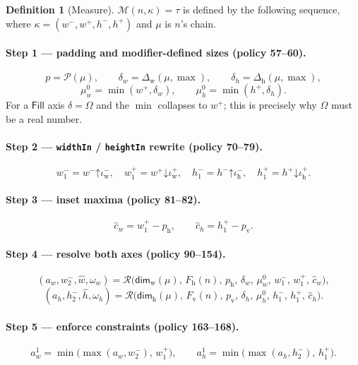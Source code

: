 \documentclass[11pt,a4paper]{article}
\newcommand{\Om}{\Omega}
\newcommand{\Fill}{\mathsf{Fill}}
\newcommand{\Mm}{\mathcal{M}}          %
\newcommand{\Rr}{\mathcal{R}}          %
\newcommand{\Pp}{\mathcal{P}}          %
\newcommand{\Dw}{\Delta_{\mathrm{w}}}
\newcommand{\Dh}{\Delta_{\mathrm{h}}}
\newcommand{\Iw}{\iota_{\mathrm{w}}}
\newcommand{\Ih}{\iota_{\mathrm{h}}}
\newcommand{\Dimw}{\mathsf{dim}_{\mathrm{w}}}
\newcommand{\Dimh}{\mathsf{dim}_{\mathrm{h}}}
\newcommand{\clampL}{\mathord{\uparrow}}
\newcommand{\clampH}{\mathord{\downarrow}}
\theoremstyle{definition}
\newtheorem{definition}{Definition}[section]
\theoremstyle{plain}
\theoremstyle{remark}
\begin{document}
\begin{definition}[Measure]
$\Mm(n, \kappa) = \tau$ is defined by the following sequence, where
$\kappa = (w^-, w^+, h^-, h^+)$ and $\mu$ is $n$'s chain.
\end{definition}

\paragraph{Step 1 --- padding and modifier-defined sizes (policy 57--60).}
\[
  p = \Pp(\mu), \qquad
  \delta_w = \Dw(\mu, \max), \qquad
  \delta_h = \Dh(\mu, \max),
\]
\[
  \mu^0_w = \min(w^+, \delta_w), \qquad
  \mu^0_h = \min(h^+, \delta_h).
\]
For a $\Fill$ axis $\delta = \Om$ and the $\min$ collapses to $w^+$; this is
precisely why $\Om$ must be a real number.

\paragraph{Step 2 --- \texttt{widthIn} / \texttt{heightIn} rewrite (policy 70--79).}
\[
  w^-_1 = w^- \clampL \Iw^-, \quad
  w^+_1 = w^+ \clampH \Iw^+, \quad
  h^-_1 = h^- \clampL \Ih^-, \quad
  h^+_1 = h^+ \clampH \Ih^+ .
\]

\paragraph{Step 3 --- inset maxima (policy 81--82).}
\[
  \hat c_w = w^+_1 - p_{\mathrm{h}}, \qquad
  \hat c_h = h^+_1 - p_{\mathrm{v}} .
\]

\paragraph{Step 4 --- resolve both axes (policy 90--154).}
\[
  (a_w, w^-_2, \hat w, \omega_w)
    = \Rr\bigl(\Dimw(\mu),\, F_{\mathrm{h}}(n),\, p_{\mathrm{h}},\, \delta_w,\,
               \mu^0_w,\, w^-_1,\, w^+_1,\, \hat c_w\bigr),
\]
\[
  (a_h, h^-_2, \hat h, \omega_h)
    = \Rr\bigl(\Dimh(\mu),\, F_{\mathrm{v}}(n),\, p_{\mathrm{v}},\, \delta_h,\,
               \mu^0_h,\, h^-_1,\, h^+_1,\, \hat c_h\bigr).
\]

\paragraph{Step 5 --- enforce constraints (policy 163--168).}
\[
  a^1_w = \min\bigl(\max(a_w, w^-_2),\, w^+_1\bigr), \qquad
  a^1_h = \min\bigl(\max(a_h, h^-_2),\, h^+_1\bigr).
\]
\end{document}

